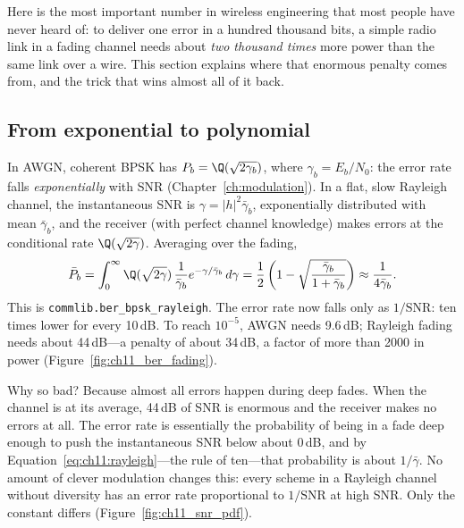 Here is the most important number in wireless engineering that most people have never heard of:
to deliver one error in a hundred thousand bits, a simple radio link in a fading channel needs
about \emph{two thousand times} more power than the same link over a wire. This section explains
where that enormous penalty comes from, and the trick that wins almost all of it back.


\subsection{From exponential to polynomial}

In AWGN, coherent BPSK has $P_b=\Q(\sqrt{2\gamma_b})$, where $\gamma_b=E_b/N_0$: the error rate falls
\emph{exponentially} with SNR (Chapter~\ref{ch:modulation}). In a flat, slow Rayleigh channel, the
instantaneous SNR is $\gamma=|h|^2\bar\gamma_b$, exponentially distributed with mean $\bar\gamma_b$,
and the receiver (with perfect channel knowledge) makes errors at the conditional rate
$\Q(\sqrt{2\gamma})$. Averaging over the fading,
\begin{equation}
\bar P_b=\int_0^\infty\Q(\sqrt{2\gamma})\,\frac{1}{\bar\gamma_b}e^{-\gamma/\bar\gamma_b}\,d\gamma
=\frac12\left(1-\sqrt{\frac{\bar\gamma_b}{1+\bar\gamma_b}}\right)\approx\frac{1}{4\bar\gamma_b}.
\label{eq:ch11:berray}
\end{equation}
This is \texttt{commlib.ber\_bpsk\_rayleigh}. The error rate now falls only as $1/\text{SNR}$: ten
times lower for every 10\,dB. To reach $10^{-5}$, AWGN needs 9.6\,dB; Rayleigh fading needs about
44\,dB---a penalty of about 34\,dB, a factor of more than 2000 in power (Figure~\ref{fig:ch11_ber_fading}).

Why so bad? Because almost all errors happen during deep fades. When the channel is at its average,
44\,dB of SNR is enormous and the receiver makes no errors at all. The error rate is essentially the
probability of being in a fade deep enough to push the instantaneous SNR below about 0\,dB, and by
Equation~\eqref{eq:ch11:rayleigh}---the rule of ten---that probability is about $1/\bar\gamma$. No
amount of clever modulation changes this: every scheme in a Rayleigh channel without diversity has
an error rate proportional to $1/\text{SNR}$ at high SNR. Only the constant differs
(Figure~\ref{fig:ch11_snr_pdf}).

